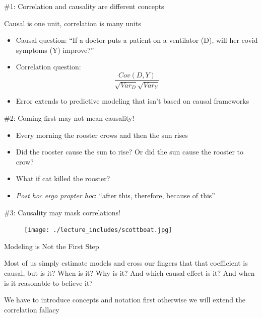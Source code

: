 \documentclass{beamer}
\begin{document}
\begin{frame}{\#1: Correlation and causality are different concepts}

  Causal is one unit, correlation is many units
  \begin{itemize}
    \item Causal question: ``If a doctor puts a patient on a ventilator (D), will her covid symptoms (Y) improve?''
    \item Correlation question:  $$\frac{Cov(D,Y)}{\sqrt{Var_D}\sqrt{{Var_Y}}}$$
    \item Error extends to predictive modeling that isn't based on causal frameworks
  \end{itemize}

\end{frame}



\begin{frame}{\#2: Coming first may not mean causality!}

  \begin{itemize}
    \item Every morning the rooster crows and then the sun rises
    \item Did the rooster cause the sun to rise? Or did the sun cause the rooster to crow?
    \item What if cat killed the rooster?
    \item \emph{Post hoc ergo propter hoc}: ``after this, therefore, because of this''
  \end{itemize}

\end{frame}

\begin{frame}{\#3: Causality may mask correlations!}

  \begin{figure}
    \centering
    \texttt{[image: ./lecture\_includes/scottboat.jpg]}
  \end{figure}

\end{frame}






\begin{frame}{Modeling is Not the First Step}

Most of us simply estimate models and cross our fingers that that coefficient is causal, but is it? When is it?  Why is it? And which causal effect is it?  And when is it reasonable to believe it? 

\bigskip

We have to introduce concepts and notation first otherwise we will extend the correlation fallacy


\end{frame}
\end{document}
